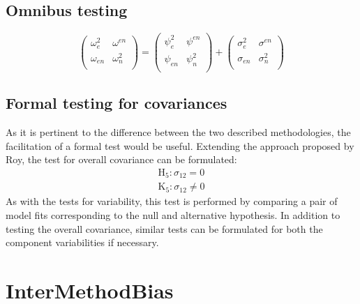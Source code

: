 \documentclass[12pt, a4paper]{report}
\theoremstyle{plain}
\theoremstyle{definition}
\theoremstyle{remark}
\begin{document}
	
	

	\section{Omnibus testing}
	
	
	\begin{equation}
	\left( \begin{array}{cc}
	\omega^2_{e} & \omega^{en} \\
	\omega_{en} & \omega^2_{n} \\
	\end{array}\right)
	=
	\left( \begin{array}{cc}
	\psi^2_{e} & \psi^{en} \\
	\psi_{en} & \psi^2_{n} \\
	\end{array}\right)
	+
	\left( \begin{array}{cc}
	\sigma^2_{e} & \sigma^{en} \\
	\sigma_{en} & \sigma^2_{n} \\
	\end{array}\right)
	\end{equation}
	
	

\section{Formal testing for covariances }
As it is pertinent to the difference between the two described methodologies, the facilitation of a formal test would be useful. Extending the approach proposed by Roy, the test for overall covariance can be formulated:
\begin{eqnarray*}
	\operatorname{H_5} : \sigma_{12} = 0 \\
	\operatorname{K_5} : \sigma_{12} \neq 0
\end{eqnarray*}
As with the tests for variability, this test is performed by comparing a pair of model fits corresponding to the null and alternative hypothesis. In addition to testing the overall covariance, similar tests can be formulated for both the component variabilities if necessary.

	
	
	
\chapter{InterMethodBias}
\end{document}
